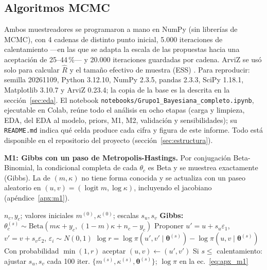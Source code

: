 \documentclass[10pt,twocolumn]{article}
\newcommand{\logit}{\operatorname{logit}}
\begin{document}
\subsection{Algoritmos MCMC}
Ambos muestreadores se programaron a mano en NumPy (sin librerías de MCMC), con 4 cadenas de distinto punto inicial, 5.000 iteraciones de calentamiento ---en las que se adapta la escala de las propuestas hacia una aceptación de 25--44\,\%--- y 20.000 iteraciones guardadas por cadena. ArviZ \citep{kumar2019arviz} se usó solo para calcular $\widehat R$ y el tamaño efectivo de muestra (ESS) \citep{vehtari2021rhat}. Para reproducir: semilla 20261109, Python 3.12.10, NumPy 2.3.5, pandas 2.3.3, SciPy 1.18.1, Matplotlib 3.10.7 y ArviZ 0.23.4; la copia de la base es la descrita en la sección~\ref{sec:eda}. El notebook \texttt{notebooks/Grupo1\_Bayesiana\_completo.ipynb}, ejecutable en Colab, reúne todo el análisis en ocho etapas (carga y limpieza, EDA, del EDA al modelo, priors, M1, M2, validación y sensibilidades); su \texttt{README.md} indica qué celda produce cada cifra y figura de este informe. Todo está disponible en el repositorio del proyecto (sección~\ref{sec:estructura}).

\textbf{M1: Gibbs con un paso de Metropolis-Hastings.} Por conjugación Beta-Binomial, la condicional completa de cada $\theta_c$ es Beta y se muestrea exactamente (Gibbs). La de $(m,\kappa)$ no tiene forma conocida y se actualiza con un paseo aleatorio en $(u,v)=(\logit m,\log\kappa)$, incluyendo el jacobiano (apéndice~\ref{apx:m1}).
\begin{algorithm}[t]
\caption{Gibbs + Metropolis-Hastings para M1}\label{alg:m1}
\small
\begin{algorithmic}[1]
\Require $n_c,y_c$; valores iniciales $m^{(0)},\kappa^{(0)}$; escalas $s_u,s_v$
\State \textbf{Gibbs:} $\theta_c^{(s)}\sim\mathrm{Beta}(m\kappa+y_c,\,(1-m)\kappa+n_c-y_c)$
\State Proponer $u'=u+s_u\varepsilon_1$, $v'=v+s_v\varepsilon_2$, $\varepsilon_i\sim N(0,1)$
\State $\log r=\log\pi(u',v'\mid\bm\theta^{(s)})-\log\pi(u,v\mid\bm\theta^{(s)})$
\State Con probabilidad $\min(1,r)$ aceptar $(u,v)\gets(u',v')$
\State Si $s\le$ calentamiento: ajustar $s_u,s_v$ cada 100 iter.
\EndFor
\Ensure $\{m^{(s)},\kappa^{(s)},\bm\theta^{(s)}\}$; $\log\pi$ en la ec.~\eqref{eq:apx_m1}
\end{algorithmic}
\end{algorithm}
\end{document}
